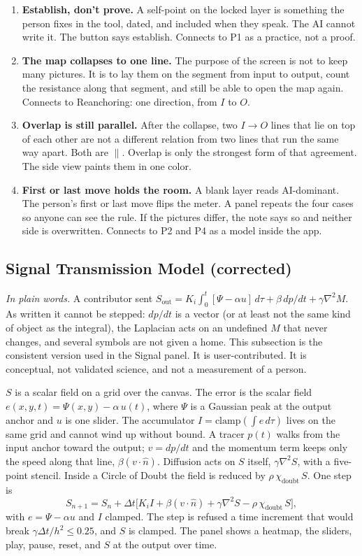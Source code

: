 \documentclass[11pt]{article}
\begin{document}
\begin{enumerate}[leftmargin=1.2em]
\item \textbf{Establish, don't prove.} A self-point on the locked layer is something the person fixes in the tool, dated, and included when they speak. The AI cannot write it. The button says establish. Connects to P1 as a practice, not a proof.
\item \textbf{The map collapses to one line.} The purpose of the screen is not to keep many pictures. It is to lay them on the segment from input to output, count the resistance along that segment, and still be able to open the map again. Connects to Reanchoring: one direction, from \(I\) to \(O\).
\item \textbf{Overlap is still parallel.} After the collapse, two \(I\to O\) lines that lie on top of each other are not a different relation from two lines that run the same way apart. Both are \(\parallel\). Overlap is only the strongest form of that agreement. The side view paints them in one color.
\item \textbf{First or last move holds the room.} A blank layer reads AI-dominant. The person's first or last move flips the meter. A panel repeats the four cases so anyone can see the rule. If the pictures differ, the note says so and neither side is overwritten. Connects to P2 and P4 as a model inside the app.
\end{enumerate}

\subsection*{Signal Transmission Model (corrected)}
\textit{In plain words.} A contributor sent \(S_{\mathrm{out}} = K_i \int_0^t [\Psi - \alpha u]\,d\tau + \beta\,dp/dt + \gamma\nabla^2 M\). As written it cannot be stepped: \(dp/dt\) is a vector (or at least not the same kind of object as the integral), the Laplacian acts on an undefined \(M\) that never changes, and several symbols are not given a home. This subsection is the consistent version used in the Signal panel. It is user-contributed. It is conceptual, not validated science, and not a measurement of a person.

\(S\) is a scalar field on a grid over the canvas. The error is the scalar field \(e(x,y,t)=\Psi(x,y)-\alpha\,u(t)\), where \(\Psi\) is a Gaussian peak at the output anchor and \(u\) is one slider. The accumulator \(I=\mathrm{clamp}(\int e\,d\tau)\) lives on the same grid and cannot wind up without bound. A tracer \(p(t)\) walks from the input anchor toward the output; \(v=dp/dt\) and the momentum term keeps only the speed along that line, \(\beta(v\cdot\hat{n})\). Diffusion acts on \(S\) itself, \(\gamma\nabla^2 S\), with a five-point stencil. Inside a Circle of Doubt the field is reduced by \(\rho\,\chi_{\mathrm{doubt}}\,S\). One step is
\begin{equation}
S_{n+1}=S_n+\Delta t\big[K_i I+\beta(v\cdot\hat{n})+\gamma\nabla^2 S-\rho\,\chi_{\mathrm{doubt}}\,S\big],
\end{equation}
with \(e=\Psi-\alpha u\) and \(I\) clamped. The step is refused a time increment that would break \(\gamma\Delta t/h^2\le 0.25\), and \(S\) is clamped. The panel shows a heatmap, the sliders, play, pause, reset, and \(S\) at the output over time.
\end{document}
